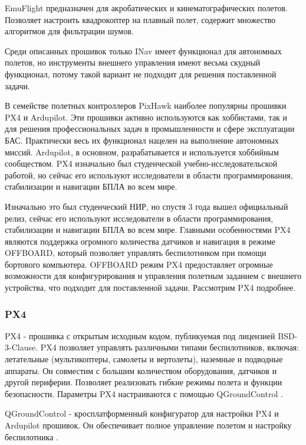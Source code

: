 EmuFlight предназначен для акробатических и кинематографических полетов. Позволяет настроить квадрокоптер на плавный полет, содержит множество алгоритмов для фильтрации шумов.

Среди описанных прошивок только INav имеет функционал для автономных полетов, но инструменты внешнего управления имеют весьма скудный функционал, потому такой вариант не подходит для решения поставленной задачи.

В семействе полетных контроллеров PixHawk наиболее популярны прошивки PX4 и Ardupilot. Эти прошивки активно используются как хоббистами, так и для решения профессиональных задач в промышленности и сфере эксплуатации БАС. Практически весь их функционал нацелен на выполнение автономных миссий. Ardupilot, в основном, разрабатывается и используется хоббийным сообществом. PX4 изначально был студенческой учебно-исследовательской работой, но сейчас его используют исследователи в области программирования, стабилизации и навигации БПЛА во всем мире.

Изначально это был студенческий НИР, но спустя 3 года вышел официальный релиз, сейчас его используют исследователи в области программирования, стабилизации и навигации БПЛА во всем мире. Главными особенностями PX4 являются поддержка огромного количества датчиков и навигация в режиме OFFBOARD, который позволяет управлять беспилотником при помощи бортового компьютера. OFFBOARD режим PX4 предоставляет огромные возможности для конфигурирования и управления полетным заданием с внешнего устройства, что подходит для поставленной задачи. Рассмотрим PX4 подробнее.

\subsubsection{PX4}

PX4 - прошивка с открытым исходным кодом, публикуемая под лицензией BSD-3-Clause. PX4 позволяет управлять различными типами беспилотников, включая: летательные (мультикоптеры, самолеты и вертолеты), наземные и подводные аппараты. Он совместим с большим количеством оборудования, датчиков и другой периферии. Позволяет реализовать гибкие режимы полета и функции безопасности.
Параметры PX4 настраиваются с помощью Q\-Ground\-Control \cite{px4}.

QGroundControl - кросплатформенный конфигуратор для настройки PX4 и Ardupilot прошивок. Он обеспечивает полное управление полетом и настройку беспилотника \cite{qgroundcontrol}.

